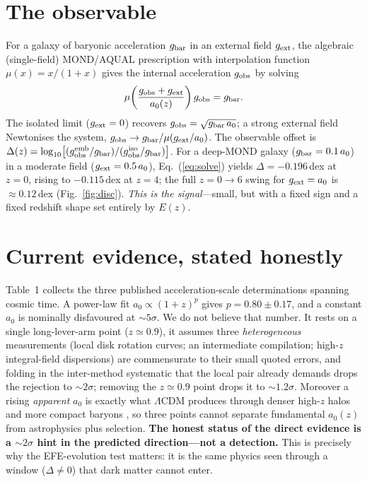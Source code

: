 \documentclass[11pt]{article}
\newcommand{\az}{a_0}
\newcommand{\gext}{g_{\rm ext}}
\newcommand{\gbar}{g_{\rm bar}}
\newcommand{\Ez}{E(z)}
\begin{document}
\section{The observable}
For a galaxy of baryonic acceleration $\gbar$ in an external field $\gext$, the
algebraic (single-field) MOND/AQUAL prescription with interpolation function
$\mu(x)=x/(1+x)$ gives the internal acceleration $g_{\rm obs}$ by solving
\begin{equation}
\mu\!\left(\frac{g_{\rm obs}+\gext}{\az(z)}\right)g_{\rm obs}=\gbar .
\label{eq:solve}
\end{equation}
The isolated limit ($\gext=0$) recovers $g_{\rm obs}=\sqrt{\gbar\,\az}$; a strong
external field Newtonises the system, $g_{\rm obs}\to\gbar/\mu(\gext/\az)$. The
observable offset is $\Delta(z)=\log_{10}\!\big[(g_{\rm obs}^{\rm emb}/\gbar)/(g_{\rm
obs}^{\rm iso}/\gbar)\big]$. For a deep-MOND galaxy ($\gbar=0.1\,\az$) in a moderate
field ($\gext=0.5\,\az$), Eq.~(\ref{eq:solve}) yields $\Delta=-0.196$\,dex at $z=0$,
rising to $-0.115$\,dex at $z=4$; the full $z=0\to6$ swing for $\gext=\az$ is
$\approx0.12$\,dex (Fig.~\ref{fig:disc}). \emph{This is the signal}---small, but with
a fixed sign and a fixed redshift shape set entirely by $\Ez$.

\section{Current evidence, stated honestly}
\label{sec:current}
Table~1 collects the three published acceleration-scale determinations spanning
cosmic time. A power-law fit $\az\propto(1+z)^p$ gives $p=0.80\pm0.17$, and a constant
$\az$ is nominally disfavoured at $\sim5\sigma$. We do not believe that number. It
rests on a single long-lever-arm point ($z\simeq0.9$), it assumes three
\emph{heterogeneous} measurements (local disk rotation curves; an intermediate
compilation; high-$z$ integral-field dispersions) are commensurate to their small
quoted errors, and folding in the inter-method systematic that the local pair already
demands drops the rejection to $\sim2\sigma$; removing the $z\simeq0.9$ point drops it
to $\sim1.2\sigma$. Moreover a rising \emph{apparent} $\az$ is exactly what
$\Lambda$CDM produces through denser high-$z$ halos and more compact baryons
\cite{Tian2022,deGraaff2024}, so three points cannot separate fundamental $\az(z)$
from astrophysics plus selection. \textbf{The honest status of the direct evidence is
a $\sim2\sigma$ hint in the predicted direction---not a detection.} This is precisely
why the EFE-evolution test matters: it is the same physics seen through a window
($\Delta\neq0$) that dark matter cannot enter.
\end{document}
